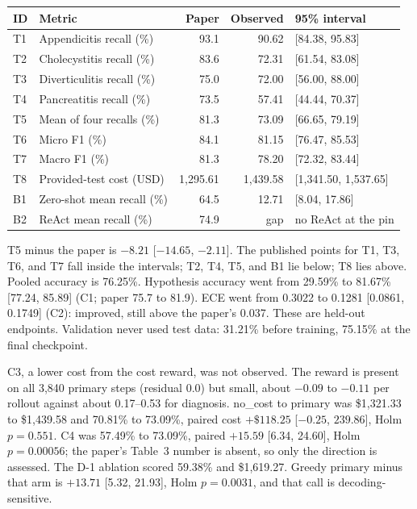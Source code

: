\documentclass[11pt,letterpaper]{article}
\begin{document}
\begin{center}
\vspace{-0.35em}
\footnotesize
\setlength{\tabcolsep}{4pt}
\renewcommand{\arraystretch}{0.94}
\begin{tabular}{@{}llrrl@{}}
\toprule
ID & Metric & Paper & Observed & 95\% interval \\
\midrule
T1 & Appendicitis recall (\%) & 93.1 & 90.62 & [84.38, 95.83] \\
T2 & Cholecystitis recall (\%) & 83.6 & 72.31 & [61.54, 83.08] \\
T3 & Diverticulitis recall (\%) & 75.0 & 72.00 & [56.00, 88.00] \\
T4 & Pancreatitis recall (\%) & 73.5 & 57.41 & [44.44, 70.37] \\
T5 & Mean of four recalls (\%) & 81.3 & 73.09 & [66.65, 79.19] \\
T6 & Micro F1 (\%) & 84.1 & 81.15 & [76.47, 85.53] \\
T7 & Macro F1 (\%) & 81.3 & 78.20 & [72.32, 83.44] \\
T8 & Provided-test cost (USD) & 1,295.61 & 1,439.58 & [1,341.50, 1,537.65] \\
B1 & Zero-shot mean recall (\%) & 64.5 & 12.71 & [8.04, 17.86] \\
B2 & ReAct mean recall (\%) & 74.9 & gap & no ReAct at the pin \\
\bottomrule
\end{tabular}
\end{center}

\noindent
T5 minus the paper is $-8.21$ [$-14.65$, $-2.11$]. The published points for T1, T3, T6, and T7 fall inside the intervals; T2, T4, T5, and B1 lie below; T8 lies above. Pooled accuracy is 76.25\%. Hypothesis accuracy went from 29.59\% to 81.67\% [77.24, 85.89] (C1; paper 75.7 to 81.9). ECE went from 0.3022 to 0.1281 [0.0861, 0.1749] (C2): improved, still above the paper's 0.037. These are held-out endpoints. Validation never used test data: 31.21\% before training, 75.15\% at the final checkpoint.

\noindent
C3, a lower cost from the cost reward, was not observed. The reward is present on all 3,840 primary steps (residual 0.0) but small, about $-0.09$ to $-0.11$ per rollout against about 0.17--0.53 for diagnosis. no\_cost to primary was \$1,321.33 to \$1,439.58 and 70.81\% to 73.09\%, paired cost $+\$118.25$ [$-0.25$, $239.86$], Holm $p = 0.551$. C4 was 57.49\% to 73.09\%, paired $+15.59$ [6.34, 24.60], Holm $p = 0.00056$; the paper's Table~3 number is absent, so only the direction is assessed. The D-1 ablation scored 59.38\% and \$1,619.27. Greedy primary minus that arm is $+13.71$ [5.32, 21.93], Holm $p = 0.0031$, and that call is decoding-sensitive.
\end{document}
